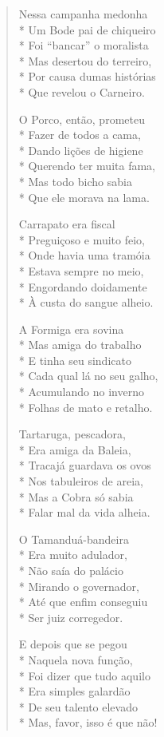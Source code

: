 \begin{verse}
Nessa campanha medonha\\*
Um Bode pai de chiqueiro\\*
Foi “bancar” o moralista\\*
Mas desertou do terreiro,\\*
Por causa dumas histórias\\*
Que revelou o Carneiro.

O Porco, então, prometeu\\*
Fazer de todos a cama,\\*
Dando lições de higiene\\*
Querendo ter muita fama,\\*
Mas todo bicho sabia\\*
Que ele morava na lama.

Carrapato era fiscal\\*
Preguiçoso e muito feio,\\*
Onde havia uma tramóia\\*
Estava sempre no meio,\\*
Engordando doidamente\\*
À custa do sangue alheio.

A Formiga era sovina\\*
Mas amiga do trabalho\\*
E tinha seu sindicato\\*
Cada qual lá no seu galho,\\*
Acumulando no inverno\\*
Folhas de mato e retalho.

Tartaruga, pescadora,\\*
Era amiga da Baleia,\\*
Tracajá guardava os ovos\\*
Nos tabuleiros de areia,\\*
Mas a Cobra só sabia\\*
Falar mal da vida alheia.

O Tamanduá-bandeira\\*
Era muito adulador,\\*
Não saía do palácio\\*
Mirando o governador,\\*
Até que enfim conseguiu\\*
Ser juiz corregedor.

E depois que se pegou\\*
Naquela nova função,\\*
Foi dizer que tudo aquilo\\*
Era simples galardão\\*
De seu talento elevado\\*
Mas, favor, isso é que não!


\end{verse}
